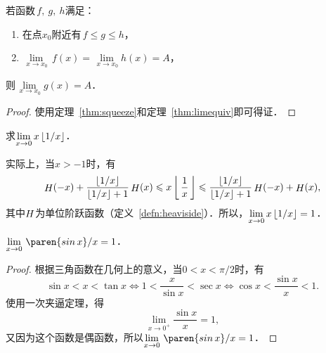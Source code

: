 \begin{theorem}[函数极限的夹逼定理]
  \label{thm:funcsqueeze}
  若函数\(\,f,\ g,\ h\)满足：
  \begin{enumerate}[topsep=0ex,itemsep=0ex]
    \renewcommand{\labelenumi}{\enumparen{\arabic{enumi}}}
  \item 在点\(x_0\)附近有\(\,f \le g \le h\)，
  \item \(\lim\limits_{\,x \to x_0\!} \,f(x) = \lim\limits_{\,x \to x_0\!} h(x) = A\)，
  \end{enumerate}
  则\(\!\lim\limits_{\,x \to x_0\!} g(x) = A\)．

  \begin{proof}
    使用定理~\ref{thm:squeeze}和定理~\ref{thm:limequiv}即可得证．
  \end{proof}
\end{theorem}

\begin{example*}
  求\(\lim\limits_{x\to0} x \, \lfloor1/x\rfloor\)．

  \begin{remark}
    实际上，当\(x > -1\)时，有
    \begin{equation*}
      \Fn H(-x) + \frac{\floor{1/x}}{\floor{1/x}+1} \Fn H(x)
      \le
      x \, \floor[\bigg]{\,\frac1x\,}
      \le
      \frac{\floor{1/x}}{\floor{1/x}+1} \Fn H(-x) + \Fn H(x),
    \end{equation*}
    其中\(\mathop{\relax H}\nolimits\)为单位阶跃函数（定义~\ref{defn:heaviside}）．所以，\(\lim\limits_{x\to0} x \, \lfloor1/x\rfloor = 1\)．
  \end{remark}
\end{example*}

\begin{theorem*}
  \(\lim\limits_{x\to0} \,\paren{\sin x}/{x} = 1\)．

  \begin{proof}
    根据三角函数在几何上的意义，当\(0 < x < \pi/2\)时，有
    \begin{equation*}
      \sin x < x < \tan x
      \iff
      1 < \frac{x}{\sin x} < \sec x
      \iff
      \cos x < \frac{\sin x}{x} < 1.
    \end{equation*}
    使用一次夹逼定理，得
    \begin{equation*}
      \lim_{x\to0^+\!} \! \frac{\sin x}{x} = 1,
    \end{equation*}
    又因为这个函数是偶函数，所以\(\lim\limits_{x\to0} \,\paren{\sin x}/{x} = 1\)．
  \end{proof}
\end{theorem*}

